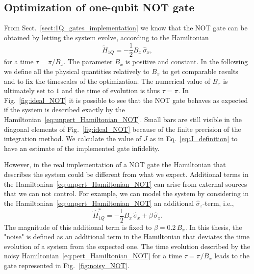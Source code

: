 \documentclass[../main/main.tex]{subfiles}
\begin{document}
\subsection{Optimization of one-qubit NOT gate}
From Sect.~\ref{sect:1Q_gates_implementation} we know that the NOT gate can be obtained by letting the system evolve, according to the Hamiltonian
\begin{equation} \label{eq:unpert_Hamiltonian_NOT}
    \hat{\tilde{H}}_{1Q} = -\frac{1}{2} B_x\, \hat{\sigma}_x,
\end{equation}
for a time $\tau=\pi/B_x$. The parameter $B_x$ is positive and constant. In the following we define all the physical quantities relatively to $B_x$ to get comparable results and to fix the timescales of the optimization. The numerical value of $B_x$ is ultimately set to $1$ and the time of evolution is thus $\tau=\pi$. In Fig.~\ref{fig:ideal_NOT} it is possible to see that the NOT gate behaves as expected if the system is described exactly by the Hamiltonian~\eqref{eq:unpert_Hamiltonian_NOT}. Small bars are still visible in the diagonal elements of Fig.~\ref{fig:ideal_NOT} because of the finite precision of the integration method. We calculate the value of $J$ as in Eq.~\eqref{eq:J_definition} to have an estimate of the implemented gate infidelity. \par
However, in the real implementation of a NOT gate the Hamiltonian that describes the system could be different from what we expect. Additional terms in the Hamiltonian~\eqref{eq:unpert_Hamiltonian_NOT} can arise from external sources that we can not control. For example, we can model the system by considering in the Hamiltonian~\eqref{eq:unpert_Hamiltonian_NOT} an additional $\hat{\sigma}_z$-term, i.e.,
\begin{equation} \label{eq:pert_Hamiltonian_NOT}
    \hat{H}^*_{1Q} = -\frac{1}{2} B_x\, \hat{\sigma}_x + \beta\, \hat{\sigma}_z .
\end{equation}
The magnitude of this additional term is fixed to $\beta = 0.2\, B_x$. In this thesis, the "noise" is defined as an additional term in the Hamiltonian that deviates the time evolution of a system from the expected one. The time evolution described by the noisy Hamiltonian~\eqref{eq:pert_Hamiltonian_NOT} for a time $\tau = \pi/B_x$ leads to the gate represented in Fig.~\ref{fig:noisy_NOT}. \par
\end{document}
